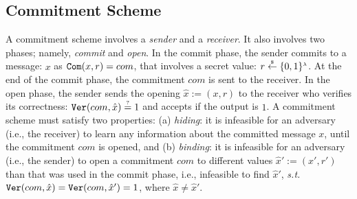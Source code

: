 


\vs

\subsection{Commitment Scheme}\label{subsec:commit}


 A commitment scheme involves a  \emph{sender} and a \emph{receiver}. It also  involves  two phases; namely, \emph{commit} and  \emph{open}. In the commit phase, the sender  commits to a message: $x$ as $\mathtt{Com}(x,r)=com$, that involves a secret value: $r\stackrel{\scriptscriptstyle\$}\leftarrow \{0,1\}^{\scriptscriptstyle\lambda}$. At the end of the commit phase,  the commitment ${com}$ is sent to the receiver. In the open phase, the sender sends the opening $\hat{x}:=(x, r)$ to the receiver who verifies its correctness: $\mathtt{Ver}({com},\hat{x})\stackrel{\scriptscriptstyle ?}=1$ and accepts if the output is $1$.  A commitment scheme must satisfy two properties: (a) \textit{hiding}: it is infeasible for an adversary (i.e., the receiver) to learn any information about the committed  message $x$, until the commitment ${com}$ is opened, and (b) \textit{binding}: it is infeasible for an adversary (i.e., the sender) to open a commitment ${com}$ to different values $\hat{x}':=(x',r')$ than that was  used in the commit phase, i.e., infeasible to find  $\hat{x}'$, \textit{s.t.} $\mathtt{Ver}({com},\hat{x})=\mathtt{Ver}({com},\hat{x}')=1$, where $\hat{x}\neq \hat{x}'$.  %